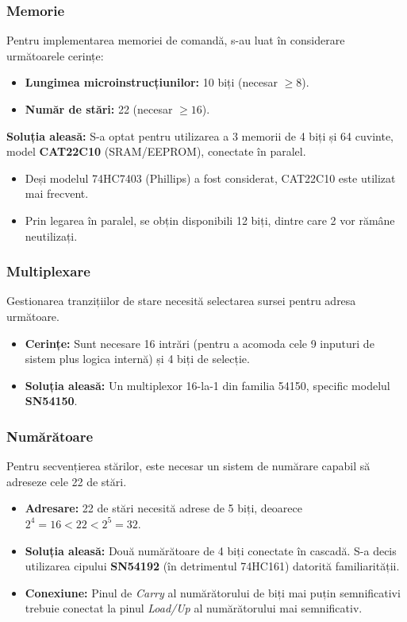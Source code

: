 \subsubsection{Memorie}
Pentru implementarea memoriei de comandă, s-au luat în considerare următoarele cerințe:
\begin{itemize}
    \item \textbf{Lungimea microinstrucțiunilor:} 10 biți (necesar $\ge 8$).
    \item \textbf{Număr de stări:} 22 (necesar $\ge 16$).
\end{itemize}

\textbf{Soluția aleasă:}
S-a optat pentru utilizarea a 3 memorii de 4 biți și 64 cuvinte, model \textbf{CAT22C10} (SRAM/EEPROM), conectate în paralel.
\begin{itemize}
    \item Deși modelul 74HC7403 (Phillips) a fost considerat, CAT22C10 este utilizat mai frecvent.
    \item Prin legarea în paralel, se obțin disponibili 12 biți, dintre care 2 vor rămâne neutilizați.
\end{itemize}

\subsubsection{Multiplexare}
Gestionarea tranzițiilor de stare necesită selectarea sursei pentru adresa următoare.
\begin{itemize}
    \item \textbf{Cerințe:} Sunt necesare 16 intrări (pentru a acomoda cele 9 inputuri de sistem plus logica internă) și 4 biți de selecție.
    \item \textbf{Soluția aleasă:} Un multiplexor 16-la-1 din familia 54150, specific modelul \textbf{SN54150}.
\end{itemize}

\subsubsection{Numărătoare}
Pentru secvențierea stărilor, este necesar un sistem de numărare capabil să adreseze cele 22 de stări.
\begin{itemize}
    \item \textbf{Adresare:} 22 de stări necesită adrese de 5 biți, deoarece $2^4 = 16 < 22 < 2^5 = 32$.
    \item \textbf{Soluția aleasă:} Două numărătoare de 4 biți conectate în cascadă. S-a decis utilizarea cipului \textbf{SN54192} (în detrimentul 74HC161) datorită familiarității.
    \item \textbf{Conexiune:} Pinul de \textit{Carry} al numărătorului de biți mai puțin semnificativi trebuie conectat la pinul \textit{Load/Up} al numărătorului mai semnificativ.
\end{itemize}

